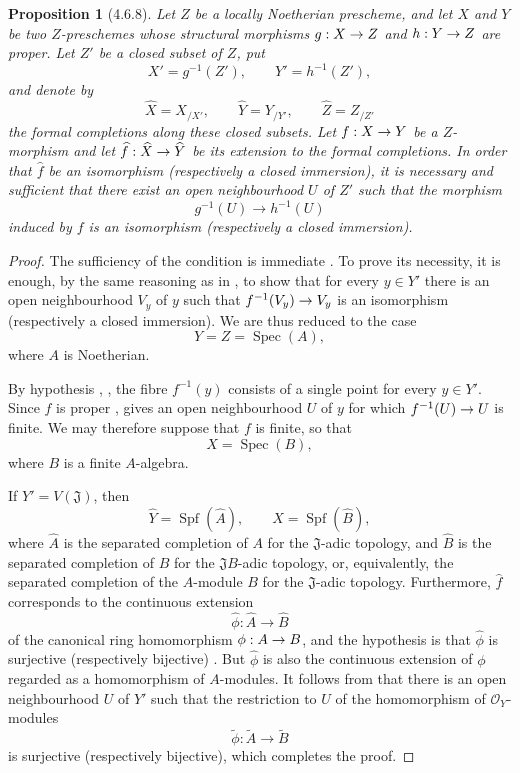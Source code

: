 \documentclass[oneside]{amsart}
\theoremstyle{ega-env-style}
\theoremstyle{ega-thm-env-style}
\newtheorem*{proposition}{Proposition}
\theoremstyle{ega-defn-env-style}
\def\mathcal{\mathscr}
\def\sh{\mathcal}                   %
\def\vphi{\phi}                     %
\def\Spec{\operatorname{Spec}}
\def\Spf{\operatorname{Spf}}
\renewcommand{\to}{\mathchoice{\longrightarrow}{\rightarrow}{\rightarrow}{\rightarrow}}
\let\EGAOriginalLabel\label
\renewcommand{\label}[1]{\phantomsection\EGAOriginalLabel{#1}}
\begin{document}
\begin{proposition}[4.6.8]
\label{III.4.6.8}
Let $Z$ be a locally Noetherian prescheme, and let $X$ and $Y$ be
two $Z$-preschemes whose structural morphisms
$g:X\to Z$ and $h:Y\to Z$ are proper.  Let $Z'$ be a closed subset
of $Z$, put
\[
  X'=g^{-1}(Z'),\qquad Y'=h^{-1}(Z'),
\]
and denote by
\[
  \widehat X=X_{/X'},\qquad
  \widehat Y=Y_{/Y'},\qquad
  \widehat Z=Z_{/Z'}
\]
the formal completions along these closed subsets.  Let $f:X\to Y$
be a $Z$-morphism and let
$\widehat f:\widehat X\to\widehat Y$ be its extension to the formal
completions.  In order that $\widehat f$ be an isomorphism
(respectively a closed immersion), it is necessary and sufficient
that there exist an open neighbourhood $U$ of $Z'$ such that the
morphism
\[
  g^{-1}(U)\longrightarrow h^{-1}(U)
\]
induced by $f$ is an isomorphism (respectively a closed immersion).
\end{proposition}

\begin{proof}
The sufficiency of the condition is immediate
.  To prove its necessity, it is enough, by the
same reasoning as in , to show that for every
$y\in Y'$ there is an open neighbourhood $V_y$ of $y$ such that
$f^{-1}(V_y)\to V_y$ is an isomorphism (respectively a closed
immersion).  We are thus reduced to the case
\[
  Y=Z=\Spec(A),
\]
where $A$ is Noetherian.

By hypothesis , , the fibre
$f^{-1}(y)$ consists of a single point for every $y\in Y'$.  Since
$f$ is proper ,  gives an open
neighbourhood $U$ of $y$ for which $f^{-1}(U)\to U$ is finite.  We
may therefore suppose that $f$ is finite, so that
\[
  X=\Spec(B),
\]
where $B$ is a finite $A$-algebra.

If $Y'=V(\mathfrak J)$, then
\[
  \widehat Y=\Spf(\widehat A),
  \qquad
  \widehat X=\Spf(\widehat B),
\]
where $\widehat A$ is the separated completion of $A$ for the
$\mathfrak J$-adic topology, and $\widehat B$ is the separated
completion of $B$ for the $\mathfrak JB$-adic topology, or,
equivalently, the separated completion of the $A$-module $B$ for
the $\mathfrak J$-adic topology.  Furthermore, $\widehat f$
corresponds to the continuous extension
\[
  \widehat{\vphi}:\widehat A\longrightarrow\widehat B
\]
of the canonical ring homomorphism $\vphi:A\to B$, and the
hypothesis is that $\widehat{\vphi}$ is surjective (respectively
bijective) .  But $\widehat{\vphi}$ is also the
continuous extension of $\vphi$ regarded as a homomorphism of
$A$-modules.  It follows from  that there is an
open neighbourhood $U$ of $Y'$ such that the restriction to $U$ of
the homomorphism of $\sh{O}_Y$-modules
\[
  \widetilde{\vphi}:\widetilde A\longrightarrow\widetilde B
\]
is surjective (respectively bijective), which completes the proof.
\end{proof}
\end{document}
